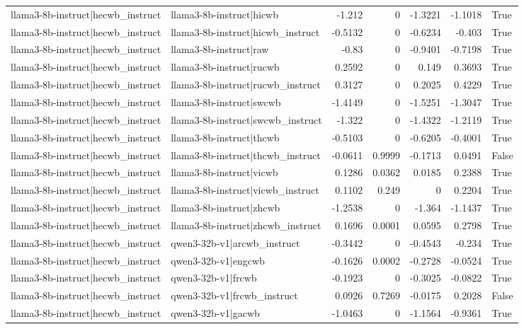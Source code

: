 \begin{table}
\begin{tabular}{l l r r r r l}
llama3-8b-instruct|hecwb_instruct & llama3-8b-instruct|hicwb & -1.212 & 0 & -1.3221 & -1.1018 & True \\
llama3-8b-instruct|hecwb_instruct & llama3-8b-instruct|hicwb_instruct & -0.5132 & 0 & -0.6234 & -0.403 & True \\
llama3-8b-instruct|hecwb_instruct & llama3-8b-instruct|raw & -0.83 & 0 & -0.9401 & -0.7198 & True \\
llama3-8b-instruct|hecwb_instruct & llama3-8b-instruct|rucwb & 0.2592 & 0 & 0.149 & 0.3693 & True \\
llama3-8b-instruct|hecwb_instruct & llama3-8b-instruct|rucwb_instruct & 0.3127 & 0 & 0.2025 & 0.4229 & True \\
llama3-8b-instruct|hecwb_instruct & llama3-8b-instruct|swcwb & -1.4149 & 0 & -1.5251 & -1.3047 & True \\
llama3-8b-instruct|hecwb_instruct & llama3-8b-instruct|swcwb_instruct & -1.322 & 0 & -1.4322 & -1.2119 & True \\
llama3-8b-instruct|hecwb_instruct & llama3-8b-instruct|thcwb & -0.5103 & 0 & -0.6205 & -0.4001 & True \\
llama3-8b-instruct|hecwb_instruct & llama3-8b-instruct|thcwb_instruct & -0.0611 & 0.9999 & -0.1713 & 0.0491 & False \\
llama3-8b-instruct|hecwb_instruct & llama3-8b-instruct|vicwb & 0.1286 & 0.0362 & 0.0185 & 0.2388 & True \\
llama3-8b-instruct|hecwb_instruct & llama3-8b-instruct|vicwb_instruct & 0.1102 & 0.249 & 0 & 0.2204 & True \\
llama3-8b-instruct|hecwb_instruct & llama3-8b-instruct|zhcwb & -1.2538 & 0 & -1.364 & -1.1437 & True \\
llama3-8b-instruct|hecwb_instruct & llama3-8b-instruct|zhcwb_instruct & 0.1696 & 0.0001 & 0.0595 & 0.2798 & True \\
llama3-8b-instruct|hecwb_instruct & qwen3-32b-v1|arcwb_instruct & -0.3442 & 0 & -0.4543 & -0.234 & True \\
llama3-8b-instruct|hecwb_instruct & qwen3-32b-v1|engcwb & -0.1626 & 0.0002 & -0.2728 & -0.0524 & True \\
llama3-8b-instruct|hecwb_instruct & qwen3-32b-v1|frcwb & -0.1923 & 0 & -0.3025 & -0.0822 & True \\
llama3-8b-instruct|hecwb_instruct & qwen3-32b-v1|frcwb_instruct & 0.0926 & 0.7269 & -0.0175 & 0.2028 & False \\
llama3-8b-instruct|hecwb_instruct & qwen3-32b-v1|gacwb & -1.0463 & 0 & -1.1564 & -0.9361 & True \\

\end{tabular}
\end{table}

